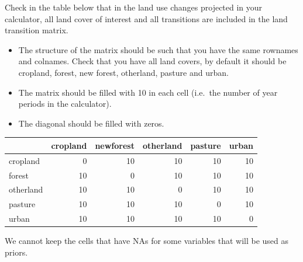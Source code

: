 \documentclass[
]{article}
\begin{document}
Check in the table below that in the land use changes projected in your
calculator, all land cover of interest and all transitions are included
in the land transition matrix.

\begin{itemize}
\item
  The structure of the matrix should be such that you have the same
  rownames and colnames. Check that you have all land covers, by default
  it should be cropland, forest, new forest, otherland, pasture and
  urban.
\item
  The matrix should be filled with 10 in each cell (i.e.~the number of
  year periods in the calculator).
\item
  The diagonal should be filled with zeros.
\end{itemize}

\begin{longtable}[]{@{}lrrrrr@{}}
\toprule\noalign{}
& cropland & newforest & otherland & pasture & urban \\
\midrule\noalign{}
\endhead
\bottomrule\noalign{}
\endlastfoot
cropland & 0 & 10 & 10 & 10 & 10 \\
forest & 10 & 0 & 10 & 10 & 10 \\
otherland & 10 & 10 & 0 & 10 & 10 \\
pasture & 10 & 10 & 10 & 0 & 10 \\
urban & 10 & 10 & 10 & 10 & 0 \\
\end{longtable}

We cannot keep the cells that have NAs for some variables that will be
used as priors.
\end{document}
